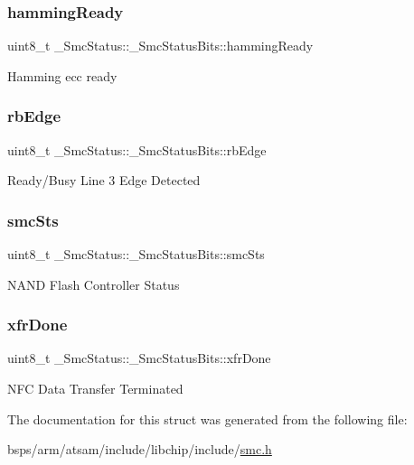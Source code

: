 \subsubsection{\texorpdfstring{hammingReady}{hammingReady}}
{\footnotesize\ttfamily uint8\+\_\+t \+\_\+\+Smc\+Status\+::\+\_\+\+Smc\+Status\+Bits\+::hamming\+Ready}

Hamming ecc ready \mbox{\label{struct__SmcStatus_1_1__SmcStatusBits_a61b71b2c13211ce8fd0d17a2be77760f}} 
\subsubsection{\texorpdfstring{rbEdge}{rbEdge}}
{\footnotesize\ttfamily uint8\+\_\+t \+\_\+\+Smc\+Status\+::\+\_\+\+Smc\+Status\+Bits\+::rb\+Edge}

Ready/\+Busy Line 3 Edge Detected \mbox{\label{struct__SmcStatus_1_1__SmcStatusBits_a5abc395e090868859cc63c88b9533371}} 
\subsubsection{\texorpdfstring{smcSts}{smcSts}}
{\footnotesize\ttfamily uint8\+\_\+t \+\_\+\+Smc\+Status\+::\+\_\+\+Smc\+Status\+Bits\+::smc\+Sts}

N\+A\+ND Flash Controller Status \mbox{\label{struct__SmcStatus_1_1__SmcStatusBits_ae2117ed2167d3cf7524a539629b17ebb}} 
\subsubsection{\texorpdfstring{xfrDone}{xfrDone}}
{\footnotesize\ttfamily uint8\+\_\+t \+\_\+\+Smc\+Status\+::\+\_\+\+Smc\+Status\+Bits\+::xfr\+Done}

N\+FC Data Transfer Terminated 

The documentation for this struct was generated from the following file\+:\begin{DoxyCompactItemize}
\item 
bsps/arm/atsam/include/libchip/include/\mbox{\hyperlink{atsam_2include_2libchip_2include_2smc_8h}{smc.\+h}}\end{DoxyCompactItemize}
